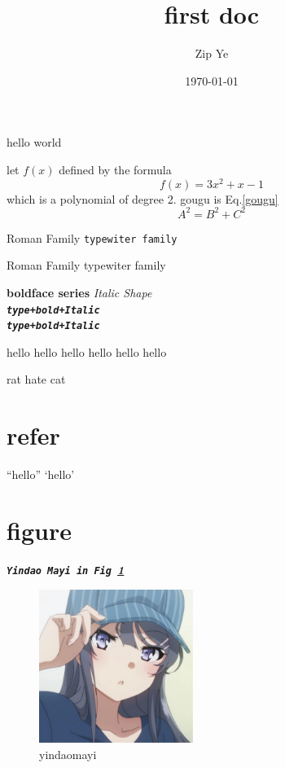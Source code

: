 \documentclass[12pt]{article} %
\title{first doc}
\author{Zip Ye}
\date{\today}
\newcommand{\xixi}{^2}
\newcommand{\myfont}[1]{\texttt{\textbf{\textit{#1}}}}
\newcommand{\hate}[2]{#1 hate #2}  %
\begin{document}
    \maketitle
    hello world

    let $f(x)$ defined by the formula $$f(x)=3x^2+x-1$$ which is a polynomial
    of degree 2. gougu is Eq.\ref{gougu}
    \begin{equation}
        A\xixi=B\xixi+C\xixi \label{gougu}
    \end{equation}

    \textrm{Roman Family} \texttt{typewiter family}

    {\rmfamily Roman Family} {\ttfamily typewiter family}

    \textbf{boldface series} \textit{Italic Shape}\\
    \texttt{\textbf{\textit{type+bold+Italic}}}\\
    \myfont{type+bold+Italic}

    {\tiny hello\cite{b2}}
    {\scriptsize hello}
    {\small hello}
    {\normalsize hello}
    {\large hello}
    {\huge hello\cite{b1}}

    \hate{rat}{cat}
    \section{refer}
    ``hello'' `hello'
    \section{figure}
    \myfont{Yindao Mayi in Fig \ref{Fig.1}}
    \begin{figure}[H]
    \vspace{0.cm}
    \centering
    \includegraphics[width=5cm,
                     height=5cm]{timg.jpeg}
    \setlength{\abovecaptionskip}{0.cm}
    \setlength{\belowcaptionskip}{0.cm}
    \caption{\small yindaomayi}\label{Fig.1}
    \end{figure}
\end{document}
